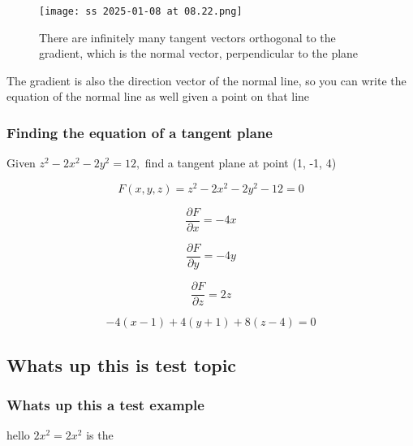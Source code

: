 \documentclass{article}
\begin{document}
\begin{figure}[h]
\caption{There are infinitely many tangent vectors orthogonal to the gradient, which is the normal vector, perpendicular to the plane}
\centering
\texttt{[image: ss 2025-01-08 at 08.22.png]}
\end{figure}
The gradient is also the direction vector of the normal line, so you can write the equation of the normal line as well given a point on that line\\

\subsubsection{Finding the equation of a tangent plane}
Given $z^2 - 2x^2 - 2y^2 = 12,$ find a tangent plane at point (1, -1, 4)

\begin{equation}
F(x, y, z) = z^2 - 2x^2 - 2y^2 - 12 = 0
\end{equation}

\begin{equation}
\frac{\partial F}{\partial x} = -4x
\end{equation}

\begin{equation}
\frac{\partial F}{\partial y} = -4y
\end{equation}

\begin{equation}
\frac{\partial F}{\partial z} = 2z
\end{equation}

\begin{equation}
-4(x-1) + 4(y+1) +8(z-4) = 0
\end{equation}

\subsection{Whats up this is test topic}

\subsubsection{    Whats up this a test example}
hello $2x^2 = 2x^2$ is the\\
\end{document}
